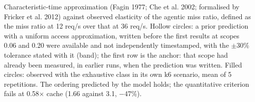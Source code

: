 Characteristic-time approximation (Fagin 1977; Che et al. 2002; formalised by Fricker et al. 2012) against observed elasticity of the agentic miss ratio, defined as the miss ratio at 12 req/s over that at 36 req/s. Hollow circles: a prior prediction with a uniform access approximation, written before the first results at scopes 0.06 and 0.20 were available and not independently timestamped, with the $\pm$30\% tolerance stated with it (band); the first row is the anchor: that scope had already been measured, in earlier runs, when the prediction was written. Filled circles: observed with the exhaustive class in its own k6 scenario, mean of 5 repetitions. The ordering predicted by the model holds; the quantitative criterion fails at 0.58$\times$ cache (1.66 against 3.1, $-$47\%).
